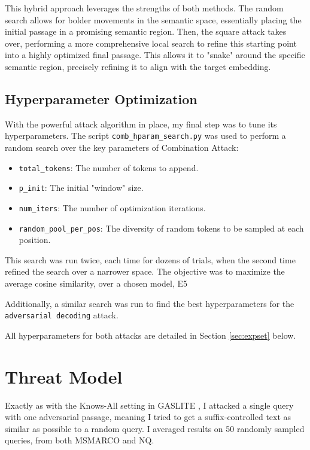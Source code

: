 \documentclass[a4paper, sigconf]{acmart}
\begin{document}
This hybrid approach leverages the strengths of both methods. The random search allows for bolder movements in the semantic space, essentially placing the initial passage in a promising semantic region. Then, the square attack takes over, performing a more comprehensive local search to refine this starting point into a highly optimized final passage. This allows it to "snake" around the specific semantic region, precisely refining it to align with the target embedding.


\subsection{Hyperparameter Optimization}

With the powerful attack algorithm in place, my final step was to tune its hyperparameters. The script \texttt{comb\_hparam\_search.py} was used to perform a random search over the key parameters of Combination Attack:

\begin{itemize}
  \item \texttt{total\_tokens}: The number of tokens to append.
  \item \texttt{p\_init}: The initial "window" size.
  \item \texttt{num\_iters}: The number of optimization iterations.
  \item \texttt{random\_pool\_per\_pos}: The diversity of random tokens to be sampled at each position.
\end{itemize}

This search was run twice, each time for dozens of trials, when the second time refined the search over a narrower space. The objective was to maximize the average cosine similarity, over a chosen model, E5 \cite{e5}

Additionally, a similar search was run to find the best hyperparameters for the \texttt{adversarial decoding} attack.

All hyperparameters for both attacks are detailed in Section \ref{sec:expset} below.  


\section{Threat Model} 

Exactly as with the Knows-All setting in GASLITE \cite{bentov2024}, I attacked a single query with one adversarial passage, meaning I tried to get a suffix-controlled text as similar as possible to a random query. I averaged results on 50 randomly sampled queries, from both MSMARCO and NQ. 
\end{document}
